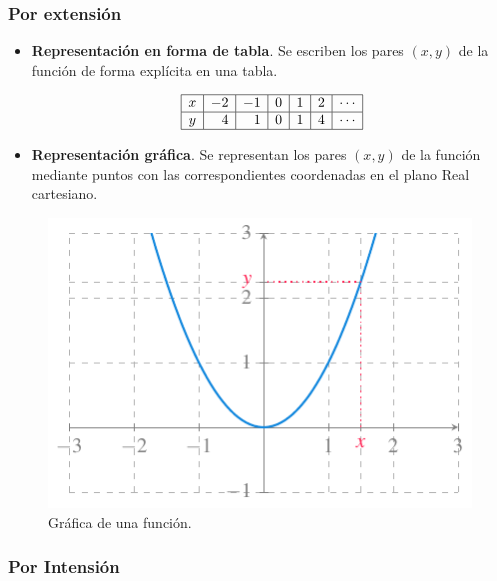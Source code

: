 \documentclass[
  a4paper,
]{scrreport}
\theoremstyle{definition}
\theoremstyle{plain}
\theoremstyle{definition}
\theoremstyle{definition}
\theoremstyle{plain}
\theoremstyle{plain}
\theoremstyle{remark}
\begin{document}
\subsubsection*{Por extensión}\label{por-extensiuxf3n}

\begin{itemize}
\item
  \textbf{Representación en forma de tabla}. Se escriben los pares
  \((x,y)\) de la función de forma explícita en una tabla.

  \[
    \begin{array}{|c|r|r|r|r|r|r|}
    \hline
    x & -2 & -1 & 0 & 1 & 2 & \cdots \\
    \hline
    y & 4  & 1  & 0 & 1 & 4 & \cdots \\
    \hline
    \end{array}
    \]
\item
  \textbf{Representación gráfica}. Se representan los pares \((x,y)\) de
  la función mediante puntos con las correspondientes coordenadas en el
  plano Real cartesiano.
\end{itemize}

\begin{figure}[H]

{\centering \includegraphics{./img/funciones/grafica-funcion.pdf}

}

\caption{Gráfica de una función.}

\end{figure}%

\subsubsection*{Por Intensión}\label{por-intensiuxf3n}
\end{document}
